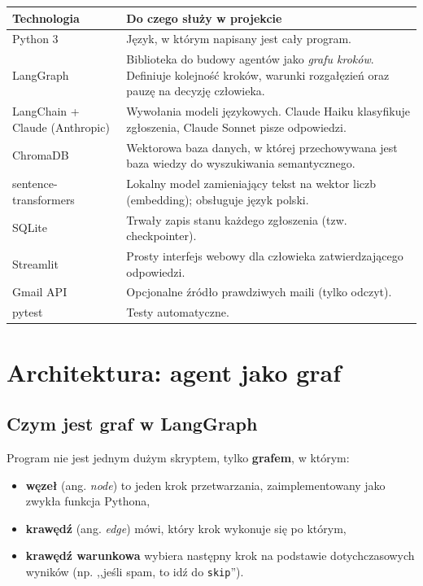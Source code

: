 \documentclass[11pt,a4paper]{article}
\begin{document}
\begin{center}
\renewcommand{\arraystretch}{1.25}
\begin{tabularx}{\textwidth}{@{}l X@{}}
\toprule
\textbf{Technologia} & \textbf{Do czego służy w projekcie} \\
\midrule
Python 3 & Język, w którym napisany jest cały program. \\
LangGraph & Biblioteka do budowy agentów jako \emph{grafu kroków}. Definiuje
  kolejność kroków, warunki rozgałęzień oraz pauzę na decyzję człowieka. \\
LangChain + Claude (Anthropic) & Wywołania modeli językowych. Claude Haiku
  klasyfikuje zgłoszenia, Claude Sonnet pisze odpowiedzi. \\
ChromaDB & Wektorowa baza danych, w której przechowywana jest baza wiedzy
  do wyszukiwania semantycznego. \\
sentence-transformers & Lokalny model zamieniający tekst na wektor liczb
  (embedding); obsługuje język polski. \\
SQLite & Trwały zapis stanu każdego zgłoszenia (tzw. checkpointer). \\
Streamlit & Prosty interfejs webowy dla człowieka zatwierdzającego odpowiedzi. \\
Gmail API & Opcjonalne źródło prawdziwych maili (tylko odczyt). \\
pytest & Testy automatyczne. \\
\bottomrule
\end{tabularx}
\end{center}

\section{Architektura: agent jako graf}

\subsection{Czym jest graf w LangGraph}

Program nie jest jednym dużym skryptem, tylko \textbf{grafem}, w którym:

\begin{itemize}
  \item \textbf{węzeł} (ang. \emph{node}) to jeden krok przetwarzania,
        zaimplementowany jako zwykła funkcja Pythona,
  \item \textbf{krawędź} (ang. \emph{edge}) mówi, który krok wykonuje się
        po którym,
  \item \textbf{krawędź warunkowa} wybiera następny krok na podstawie
        dotychczasowych wyników (np. ,,jeśli spam, to idź do \texttt{skip}'').
\end{itemize}
\end{document}
